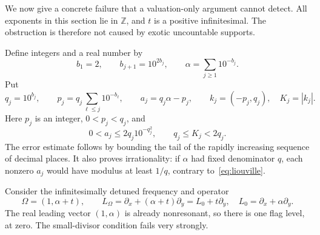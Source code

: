 \documentclass[11pt,letterpaper]{article}
\theoremstyle{definition}
\theoremstyle{remark}
\newcommand{\Z}{\mathbb Z}
\newcommand{\Lom}{L_{\Omega}}
\numberwithin{equation}{section}
\begin{document}
We now give a concrete failure that a valuation-only argument cannot detect.
All exponents in this section lie in $\Z$, and $t$ is a positive
infinitesimal.  The obstruction is therefore not caused by exotic
uncountable supports.

Define integers and a real number by
\begin{equation}\label{eq:alpha}
 b_1=2,\qquad b_{j+1}=10^{2b_j},\qquad
 \alpha=\sum_{j\ge1}10^{-b_j}.
\end{equation}
Put
\begin{equation}\label{eq:approximants}
 q_j=10^{b_j},\qquad
 p_j=q_j\sum_{\ell\le j}10^{-b_\ell},\qquad
 a_j=q_j\alpha-p_j,\qquad
 k_j=(-p_j,q_j),\quad K_j=|k_j|.
\end{equation}
Here $p_j$ is an integer, $0<p_j<q_j$, and
\begin{equation}\label{eq:liouville}
 0<a_j\le2q_j10^{-q_j^2},\qquad q_j\le K_j<2q_j.
\end{equation}
The error estimate follows by bounding the tail of the rapidly increasing
sequence of decimal places.  It also proves irrationality: if $\alpha$ had
fixed denominator $q$, each nonzero $a_j$ would have modulus at least $1/q$,
contrary to~\eqref{eq:liouville}.

Consider the infinitesimally detuned frequency and operator
\begin{equation}\label{eq:detuned}
 \Omega=(1,\alpha+t),\qquad
 \Lom=\partial_x+(\alpha+t)\partial_y=L_0+t\partial_y,
 \quad L_0=\partial_x+\alpha\partial_y.
\end{equation}
The real leading vector $(1,\alpha)$ is already nonresonant, so there is
one flag level, at zero.  The small-divisor condition fails very strongly.
\end{document}
